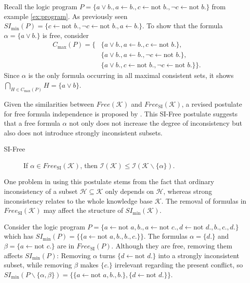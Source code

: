 \begin{example}
    Recall the logic program \(P = \{a \lor b., a \leftarrow b., c \leftarrow \text{not }b., \neg c \leftarrow \text{not }b.\}\) from example \ref{ex:program}. As previously seen \(SI_{\min}(P) = \{c \leftarrow \text{not }b., \neg c \leftarrow \text{not }b., a \leftarrow b.\}\). To show that the formula \(\alpha = \{a \lor b.\}\) is free, consider
    \begin{align*}
        C_{\max}(P) = \{ & \{a \lor b., a \leftarrow b., c \leftarrow \text{not }b.\},                   \\
                         & \{a \lor b., a \leftarrow b., \neg c \leftarrow \text{not }b.\},              \\
                         & \{a \lor b., c \leftarrow \text{not }b., \neg c \leftarrow \text{not }b.\}\}.
    \end{align*}
    Since \(\alpha\) is the only formula occurring in all maximal consistent sets, it shows \(\bigcap_{H \in C_{\max}(P)} H = \{a \lor b\}\).
\end{example}

Given the similarities between \(Free(\mathcal{K})\) and \(Free_{\text{SI}}(\mathcal{K})\), a revised postulate for free formula independence is proposed by \cite{ulbricht_handling_2020}. This SI-Free postulate suggests that a free formula \(\alpha\) not only does not increase the degree of inconsistency but also does not introduce strongly inconsistent subsets.

\begin{description}
    \item[SI-Free] If \(\alpha \in Free_{\text{SI}}(\mathcal{K})\), then \(\mathcal{I}(\mathcal{K}) \leq \mathcal{I}(\mathcal{K} \backslash \{\alpha\})\).
\end{description}

One problem in using this postulate stems from the fact that ordinary inconsistency of a subset \(\mathcal{H} \subseteq \mathcal{K}\) only depends on \(\mathcal{H}\), whereas strong inconsistency relates to the whole knowledge base \(\mathcal{K}\). The removal of formulas in \(Free_{\text{SI}}(\mathcal{K})\) may affect the structure of \(SI_{\min}(\mathcal{K})\).

\begin{example}
    Consider the logic program \(P = \{a \leftarrow \text{not } a, b., a \leftarrow \text{not }c., d \leftarrow \text{not }d., b., c., d.\}\) which has \(SI_{\min}(P) = \{\{a \leftarrow \text{not }a,b., b., c.\}\}\). The formulas \(\alpha = \{d.\}\) and \(\beta = \{a \leftarrow \text{not }c.\}\) are in \(Free_{\text{SI}}(P)\). Although they are free, removing them affects \(SI_{\min}(P)\): Removing \(\alpha\) turns \(\{d \leftarrow \text{not }d.\}\) into a strongly inconsistent subset, while removing \(\beta\) makes \(\{c.\}\) irrelevant regarding the present conflict, so \(SI_{\min}(P \backslash \{\alpha, \beta\}) = \{\{a \leftarrow \text{not }a,b., b.\}, \{d \leftarrow \text{not }d.\}\}\).
\end{example}

